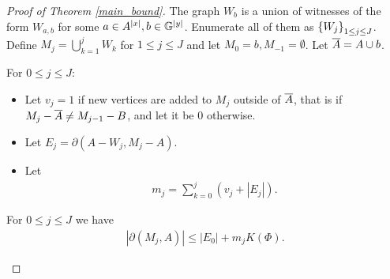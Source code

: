 \begin{proof} [Proof of Theorem \ref{main_bound}]
  The graph $W_b$ is a union of witnesses of the form $W_{a,b}$ for some $a \in A^{|x|}, b \in \mathbb G^{|y|}$.
  Enumerate all of them as $\left\{W_j\right\}_{1 \leq j \leq J}$.
  Define $M_j = \bigcup_{k=1}^j W_{k}$ for $1 \leq j \leq J$ and let $M_0 = b, M_{-1} = \emptyset$.
  Let $\overline{A} = A \cup b$.
  \begin{Definition}
    For $0 \leq j \leq J$:
    \begin{itemize}
    \item Let $v_j = 1$ if new vertices are added to $M_j$ outside of $\overline{A}$, that is if
      $M_j - \overline{A} \neq M_{j-1} - B$,
      and let it be $0$ otherwise.
    \item Let %
      $E_j = \partial(A - W_j, M_j - A)$.
    \item Let
      \begin{align*}
        m_j = \sum_{k = 0}^j (v_j + |E_j|).
      \end{align*}
    \end{itemize}
  \end{Definition}

  \begin{Lemma} \label{ubd_lemma}
    For $0 \leq j \leq J$ we have
    \begin{align*}
      |\partial(M_j, A)| \leq |E_0| + m_j K(\Phi).
    \end{align*}
  \end{Lemma}


\end{proof}
